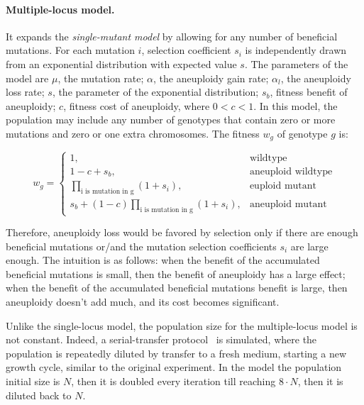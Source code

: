 \documentclass[12pt]{extarticle}
\begin{document}
\paragraph*{Multiple-locus model.} It expands the \emph{single-mutant model} by allowing for any number of beneficial mutations. For each mutation $i$, selection coefficient $s_i$ is independently drawn from an exponential distribution with expected value $s$. The parameters of the model are $\mu$, the mutation rate; $\alpha$, the aneuploidy gain rate; $\alpha_l$, the aneuploidy loss rate; $s$, the parameter of the exponential distribution; $s_b$, fitness benefit of aneuploidy; $c$, fitness cost of aneuploidy, where $0<c<1$. In this model, the population may include any number of genotypes that contain zero or more mutations and zero or one extra chromosomes. The fitness $w_g$ of genotype $g$ is: 

\begin{equation} 
w_g= 
\begin{cases}
   1, & \text{wildtype} \\
	1-c+s_b, & \text{aneuploid wildtype} \\
	\prod_{\text{i is mutation in g}}{(1+s_i)}, & \text{euploid mutant} \\ 
	s_b+(1-c)\prod_{\text{i is mutation in g}}{(1+s_i)}, & \text{aneuploid mutant}
\end{cases}
\end{equation}

Therefore, aneuploidy loss would be favored by selection only if there are enough beneficial mutations or/and the mutation selection coefficients $s_i$ are large enough. The intuition is as follows: when the benefit of the accumulated beneficial mutations is small, then the benefit of aneuploidy has a large effect; when the benefit of the accumulated beneficial mutations benefit is large, then aneuploidy doesn’t add much, and its cost becomes significant.

Unlike the single-locus model, the population size for the multiple-locus model is not constant. Indeed, a serial-transfer protocol~\citep{Barrick2013} is simulated, where the population is repeatedly diluted by transfer to a fresh medium, starting a new growth cycle, similar to the original experiment. In the model the population initial size is $N$, then it is doubled every iteration till reaching $8\cdot{N}$, then it is diluted back to $N$.
\end{document}
